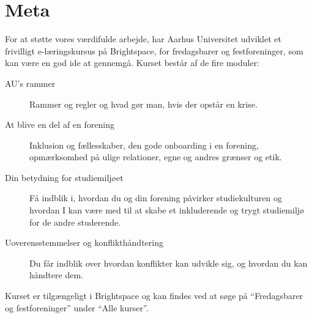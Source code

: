 \newpage
\section{Meta}
\label{sec:meta}

For at støtte vores værdifulde arbejde, har Aarhus Universitet
udviklet et frivilligt e-læringskursus på Brightspace,
for fredagsbarer og festforeninger, som kan være en god ide at gennemgå.
Kurset består af de fire moduler:
\begin{description}
    \item[AU's rammer] Rammer og regler og hvad gør man, hvis der opstår en krise.
    \item[At blive en del af en forening] Inklusion og fællesskaber, den gode
    onboarding i en forening, opmærksomhed på ulige relationer, egne og andres grænser og etik.
    \item[Din betydning for studiemiljøet] Få indblik i, hvordan du og din forening påvirker
    studiekulturen og hvordan I kan være med til at skabe et inkluderende og
    trygt studiemiljø for de andre studerende.
    \item [Uoverensstemmelser og konflikthåndtering] Du får indblik over hvordan konflikter
    kan udvikle sig, og hvordan du kan håndtere dem.
\end{description}
Kurset er tilgængeligt i Brightspace og kan findes ved at søge
på ``Fredagsbarer og festforeninger'' under ``Alle kurser''.

\printindex


